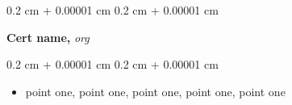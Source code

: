 \documentclass[10pt, letterpaper]{article}
\newenvironment{highlightsforbulletentries}{
        \begin{itemize}[
            topsep=0.10 cm,
            parsep=0.10 cm,
            partopsep=0pt,
            itemsep=0pt,
            leftmargin=10pt
        ]
    }{
        \end{itemize}
    }
\newenvironment{onecolentry}{
        \begin{adjustwidth}{
            0.2 cm + 0.00001 cm
        }{
            0.2 cm + 0.00001 cm
        }
    }{
        \end{adjustwidth}
    }
\newenvironment{twocolentry}[2][]{
        \onecolentry
        \def\secondColumn{#2}
        \setcolumnwidth{\fill, 4.5 cm}
        \begin{paracol}{2}
    }{
        \switchcolumn \raggedleft \secondColumn
        \end{paracol}
        \endonecolentry
    }
\begin{document}
            \begin{samepage}
                \begin{twocolentry}{
                    2026
                }
                \textbf{Cert name,}        
                \textit{org}
                \end{twocolentry}
                \vspace{0.10 cm}
                \begin{onecolentry}
                    \begin{highlightsforbulletentries}
                            \item point one, point one, point one, point one, point one
                            \vspace{-2pt}
                    \end{highlightsforbulletentries}
                \end{onecolentry}
            \end{samepage}
            \vspace{0.2 cm}
\end{document}
